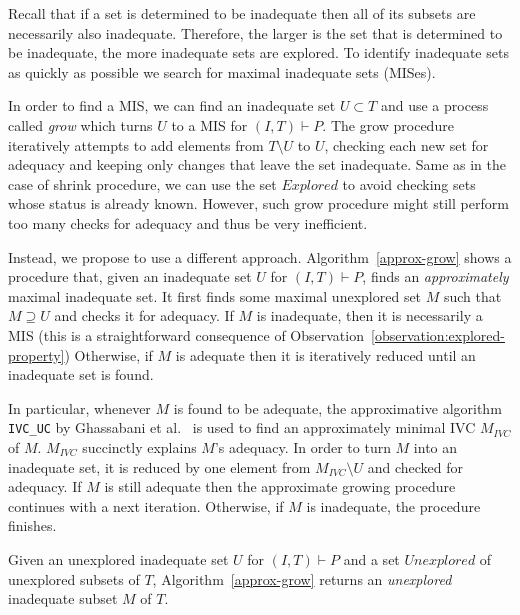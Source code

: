 Recall that if a set is determined to be inadequate then all of its subsets are necessarily also inadequate. Therefore, the larger is the set that is determined to be inadequate, the more inadequate sets are explored.  %
To identify inadequate sets as quickly as possible we search for maximal inadequate sets (MISes).

In order to find a MIS, we can find an inadequate set $U \subset T$ and use a process called \emph{grow} which turns $U$ to a MIS for $(I,T) \vdash P$.
The grow procedure iteratively attempts to add elements from $T \setminus U$ to $U$, checking each new set for adequacy and keeping only changes that leave the set inadequate. Same as in the case of shrink procedure, we can use the set $Explored$ to avoid checking sets whose status is already known.
However, such grow procedure might still perform too many checks for adequacy and thus be very inefficient.


Instead, we propose to use a different approach. Algorithm~\ref{approx-grow} shows a procedure that, given an inadequate set $U$ for $(I, T) \vdash P$, finds an \emph{approximately} maximal inadequate set.
It first finds some maximal unexplored set $M$ such that $M \supseteq U$ and checks it for adequacy.
If $M$ is inadequate, then it is necessarily a MIS
(this is a straightforward consequence of Observation~\ref{observation:explored-property}) %
Otherwise, if $M$ is adequate then it is iteratively reduced until an inadequate set is found.

In particular, whenever $M$ is found to be adequate, the approximative algorithm \texttt{IVC\_UC} by Ghassabani et al.~\cite{Ghass16} is used to find an approximately minimal IVC $M_{IVC}$ of $M$.  $M_{IVC}$ succinctly explains $M$'s adequacy. In order to turn $M$ into an inadequate set, it is reduced by one element from $M_{IVC} \setminus U$ and checked for adequacy. If $M$ is still adequate then the approximate growing procedure continues with a next iteration. Otherwise, if $M$ is inadequate, the procedure finishes.

Given an unexplored inadequate set $U$ for $(I,T) \vdash P$ and a set $\mathit{Unexplored}$ of unexplored subsets of $T$, Algorithm~\ref{approx-grow} returns an \emph{unexplored} inadequate subset $M$ of $T$.

